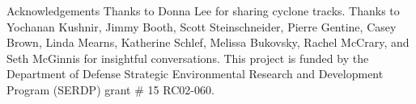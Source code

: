 \begin{block}{Acknowledgements}
    Thanks to Donna Lee for sharing cyclone tracks.
    Thanks to Yochanan Kushnir, Jimmy Booth, Scott Steinschneider, Pierre Gentine, Casey Brown, Linda Mearns, Katherine Schlef, Melissa Bukovsky, Rachel McCrary, and Seth McGinnis for insightful conversations.
    This project is funded by the Department of Defense Strategic Environmental Research and Development Program (SERDP) grant \# 15 RC02-060.
\end{block}
